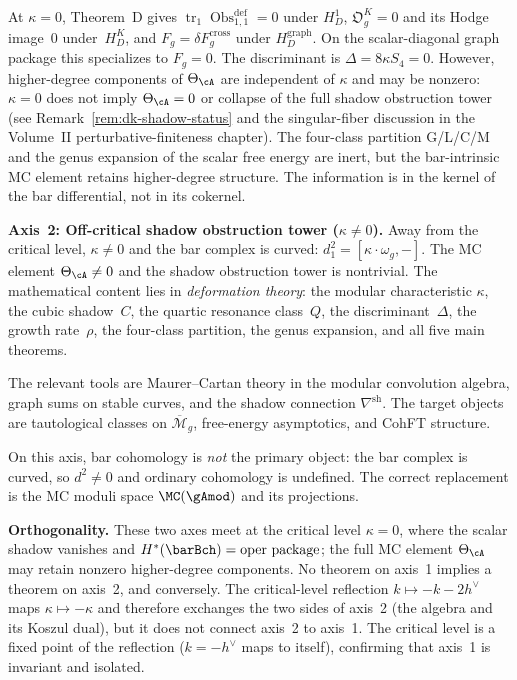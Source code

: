At $\kappa=0$, Theorem~D gives
$\operatorname{tr}_1\operatorname{Obs}^{\mathrm{def}}_{1,1}=0$ under
$H_D^1$, $\mathfrak O_g^K=0$ and its Hodge image~$0$ under~$H_D^K$,
and $F_g=\delta F_g^{\mathrm{cross}}$ under
$H_D^{\mathrm{graph}}$.  On the scalar-diagonal graph package this
specializes to $F_g=0$.  The discriminant is
$\Delta=8\kappa S_4=0$.
However, higher-degree components of $\Theta_\cA$ are
independent of $\kappa$ and may be nonzero: $\kappa = 0$
does not imply $\Theta_\cA = 0$ or collapse of the full
shadow obstruction tower
(see Remark~\ref{rem:dk-shadow-status}
and the singular-fiber discussion in the
Volume~II perturbative-finiteness chapter).
The four-class partition G/L/C/M and the
genus expansion of the scalar free energy are inert, but
the bar-intrinsic MC element retains higher-degree structure.
The information is in the kernel of the bar differential,
not in its cokernel.

\medskip\noindent
\textbf{Axis~2: Off-critical shadow obstruction tower ($\kappa \neq 0$).}\enspace
Away from the critical level, $\kappa \neq 0$ and the bar
complex is curved: $d_1^2 = [\kappa \cdot \omega_g, -]$.
The MC element $\Theta_\cA \neq 0$ and the shadow obstruction
tower is nontrivial. The mathematical content lies in
\emph{deformation theory}: the modular characteristic
$\kappa$, the cubic shadow~$C$, the quartic
resonance class~$Q$, the discriminant~$\Delta$, the growth
rate~$\rho$, the four-class partition, the genus expansion,
and all five main theorems.

The relevant tools are Maurer--Cartan theory in the modular
convolution algebra, graph sums on stable curves, and
the shadow connection $\nabla^{\mathrm{sh}}$. The target
objects are tautological classes on $\overline{\mathcal{M}}_g$,
free-energy asymptotics, and CohFT structure.

On this axis, bar cohomology is \emph{not} the primary object:
the bar complex is curved, so $d^2 \neq 0$ and ordinary
cohomology is undefined. The correct replacement is the
MC moduli space $\MC(\gAmod)$ and its projections.

\medskip\noindent
\textbf{Orthogonality.}\enspace
These two axes meet at the critical level
$\kappa = 0$, where the scalar shadow vanishes and
$H^*(\barBch) = \text{oper package}$; the full MC element
$\Theta_\cA$ may retain nonzero higher-degree components. No theorem on axis~1 implies a theorem on
 axis~2, and conversely. The critical-level reflection
$k \mapsto -k - 2h^\vee$ maps $\kappa \mapsto -\kappa$ and
therefore exchanges the two sides of axis~2 (the algebra and
its Koszul dual), but it does not connect axis~2 to axis~1.
The critical level is a fixed point of the reflection
($k = -h^\vee$ maps to itself), confirming that axis~1 is
invariant and isolated.

